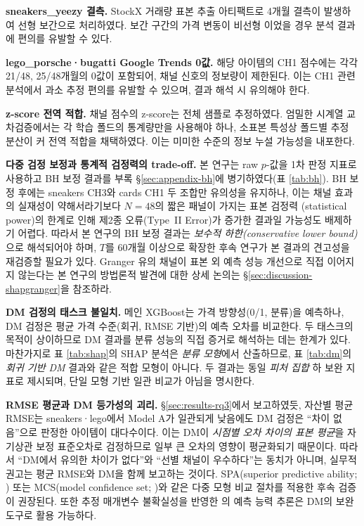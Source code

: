 \documentclass[11pt, a4paper, twocolumn]{article}
\begin{document}
\textbf{sneakers\_yeezy 결측.} StockX 거래량 표본 추출 아티팩트로 4개월
결측이 발생하여 선형 보간으로 처리하였다. 보간 구간의 가격 변동이 비선형
이었을 경우 분석 결과에 편의를 유발할 수 있다.

\textbf{lego\_porsche·bugatti Google Trends 0값.} 해당 아이템의 CH1
점수에는 각각 21/48, 25/48개월의 0값이 포함되어, 채널 신호의 정보량이
제한된다. 이는 CH1 관련 분석에서 과소 추정 편의를 유발할 수 있으며,
결과 해석 시 유의해야 한다.

\textbf{z-score 전역 적합.} 채널 점수의 z-score는 전체 샘플로 추정하였다.
엄밀한 시계열 교차검증에서는 각 학습 폴드의 통계량만을 사용해야 하나,
소표본 특성상 폴드별 추정 분산이 커 전역 적합을 채택하였다. 이는 미미한
수준의 정보 누설 가능성을 내포한다.

\textbf{다중 검정 보정과 통계적 검정력의 trade-off.} 본 연구는 raw
$p$-값을 1차 판정 지표로 사용하고 BH 보정 결과를 부록
\S\ref{sec:appendix-bh}에 병기하였다(표 \ref{tab:bh}). BH 보정 후에는
sneakers CH3와 cards CH1 두 조합만 유의성을 유지하나, 이는 채널 효과의
실재성이 약해서라기보다 $N=48$의 짧은 패널이 가지는 표본 검정력
(statistical power)의 한계로 인해 제2종 오류(Type~II Error)가 증가한
결과일 가능성도 배제하기 어렵다. 따라서 본 연구의 BH 보정 결과는
\emph{보수적 하한(conservative lower bound)}으로 해석되어야 하며,
$T$를 60개월 이상으로 확장한 후속 연구가 본 결과의 견고성을 재검증할
필요가 있다. Granger 유의 채널이 표본 외 예측 성능 개선으로 직접
이어지지 않는다는 본 연구의 방법론적 발견에 대한 상세 논의는
\S\ref{sec:discussion-shapgranger}을 참조하라.

\textbf{DM 검정의 태스크 불일치.} 메인 XGBoost는 가격 방향성(0/1, 분류)을
예측하나, DM 검정은 평균 가격 수준(회귀, RMSE 기반)의 예측 오차를 비교한다.
두 태스크의 목적이 상이하므로 DM 결과를 분류 성능의 직접 증거로 해석하는
데는 한계가 있다. 마찬가지로 표 \ref{tab:shap}의 SHAP 분석은 \emph{분류
모형}에서 산출하므로, 표 \ref{tab:dm}의 \emph{회귀 기반 DM} 결과와
같은 적합 모형이 아니다. 두 결과는 동일 \emph{피처 집합} 하 보완 지표로
제시되며, 단일 모형 기반 일관 비교가 아님을 명시한다.

\textbf{RMSE 평균과 DM 등가성의 괴리.} \S\ref{sec:results-rq3}에서
보고하였듯, 자산별 평균 RMSE는 sneakers·lego에서 Model A가 일관되게
낮음에도 DM 검정은 ``차이 없음''으로 판정한 아이템이 대다수이다. 이는
DM이 \emph{시점별 오차 차이의 표본 평균}을 자기상관 보정 표준오차로
검정하므로 일부 큰 오차의 영향이 평균화되기 때문이다. 따라서 ``DM에서
유의한 차이가 없다''와 ``선별 채널이 우수하다''는 동치가 아니며, 실무적
권고는 평균 RMSE와 DM을 함께 보고하는 것이다. SPA(superior predictive
ability; \citealp{hansen2005}) 또는 MCS(model confidence set;
\citealp{hansenlundenason2011})와 같은 다중 모형 비교 절차를 적용한
후속 검증이 권장된다. 또한 추정 매개변수 불확실성을 반영한
\citet{west1996}의 예측 능력 추론은 DM의 보완 도구로 활용 가능하다.
\end{document}
